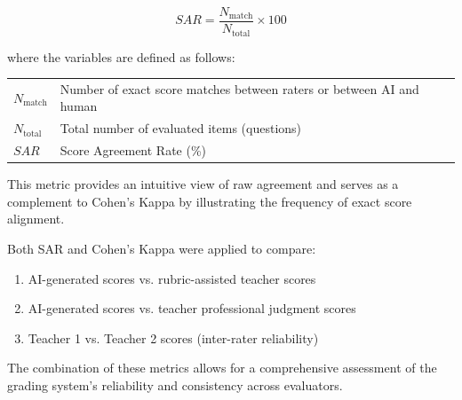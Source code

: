 \begin{equation}
    SAR = \frac{N_{\text{match}}}{N_{\text{total}}} \times 100
\end{equation}

where the variables are defined as follows:

\begin{center}
\begin{tabular}{l l}
    $N_{\text{match}}$ & Number of exact score matches between raters or between AI and human \\
    $N_{\text{total}}$ & Total number of evaluated items (questions) \\
    $SAR$ & Score Agreement Rate (\%) \\
\end{tabular}
\end{center}

This metric provides an intuitive view of raw agreement and 
serves as a complement to Cohen's Kappa by illustrating the 
frequency of exact score alignment.

Both SAR and Cohen's Kappa were applied to compare:
\begin{enumerate}
    \item AI-generated scores vs. rubric-assisted teacher scores
    \item AI-generated scores vs. teacher professional judgment scores
    \item Teacher 1 vs. Teacher 2 scores (inter-rater reliability)
\end{enumerate}

The combination of these metrics allows for a comprehensive 
assessment of the grading system’s reliability and consistency 
across evaluators.
